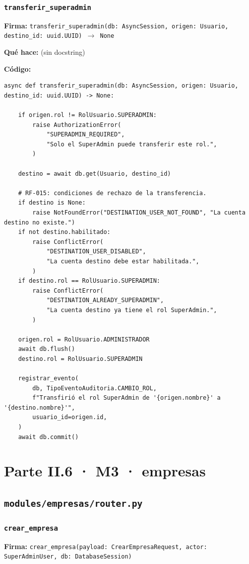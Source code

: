 \documentclass[11pt,a4paper]{article}
\begin{document}
\subsubsection*{\texttt{transferir\_superadmin}}
\textbf{Firma:} \texttt{transferir\_superadmin(db: AsyncSession, origen: Usuario, destino\_id: uuid.UUID) $\rightarrow$ None}

\textbf{Qué hace:} (sin docstring)

\textbf{Código:}
\begin{lstlisting}
async def transferir_superadmin(db: AsyncSession, origen: Usuario, destino_id: uuid.UUID) -> None:

    if origen.rol != RolUsuario.SUPERADMIN:
        raise AuthorizationError(
            "SUPERADMIN_REQUIRED",
            "Solo el SuperAdmin puede transferir este rol.",
        )

    destino = await db.get(Usuario, destino_id)

    # RF-015: condiciones de rechazo de la transferencia.
    if destino is None:
        raise NotFoundError("DESTINATION_USER_NOT_FOUND", "La cuenta destino no existe.")
    if not destino.habilitado:
        raise ConflictError(
            "DESTINATION_USER_DISABLED",
            "La cuenta destino debe estar habilitada.",
        )
    if destino.rol == RolUsuario.SUPERADMIN:
        raise ConflictError(
            "DESTINATION_ALREADY_SUPERADMIN",
            "La cuenta destino ya tiene el rol SuperAdmin.",
        )

    origen.rol = RolUsuario.ADMINISTRADOR
    await db.flush()
    destino.rol = RolUsuario.SUPERADMIN

    registrar_evento(
        db, TipoEventoAuditoria.CAMBIO_ROL,
        f"Transfirió el rol SuperAdmin de '{origen.nombre}' a '{destino.nombre}'",
        usuario_id=origen.id,
    )
    await db.commit()
\end{lstlisting}

\section{Parte II.6 · M3 · empresas}
\subsection{\texttt{modules/empresas/router.py}}

\subsubsection*{\texttt{crear\_empresa}}
\textbf{Firma:} \texttt{crear\_empresa(payload: CrearEmpresaRequest, actor: SuperAdminUser, db: DatabaseSession)}
\end{document}
